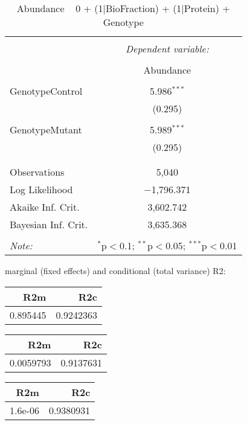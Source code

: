\documentclass[11pt]{report}
\begin{document}
\begin{table}[!htbp] \centering 
  \caption{Abundance ~ 0 + (1|BioFraction) + (1|Protein) + Genotype} 
  \label{} 
\begin{tabular}{@{\extracolsep{5pt}}lc} 
\\[-1.8ex]\hline 
\hline \\[-1.8ex] 
 & \multicolumn{1}{c}{\textit{Dependent variable:}} \\ 
\cline{2-2} 
\\[-1.8ex] & Abundance \\ 
\hline \\[-1.8ex] 
 GenotypeControl & 5.986$^{***}$ \\ 
  & (0.295) \\ 
  & \\ 
 GenotypeMutant & 5.989$^{***}$ \\ 
  & (0.295) \\ 
  & \\ 
\hline \\[-1.8ex] 
Observations & 5,040 \\ 
Log Likelihood & $-$1,796.371 \\ 
Akaike Inf. Crit. & 3,602.742 \\ 
Bayesian Inf. Crit. & 3,635.368 \\ 
\hline 
\hline \\[-1.8ex] 
\textit{Note:}  & \multicolumn{1}{r}{$^{*}$p$<$0.1; $^{**}$p$<$0.05; $^{***}$p$<$0.01} \\ 
\end{tabular} 
\end{table} 
marginal (fixed effects) and conditional (total variance) R2:

\begin{tabular}{r|r}
\hline
R2m & R2c\\
\hline
0.895445 & 0.9242363\\
\hline
\end{tabular}

\begin{tabular}{r|r}
\hline
R2m & R2c\\
\hline
0.0059793 & 0.9137631\\
\hline
\end{tabular}

\begin{tabular}{r|r}
\hline
R2m & R2c\\
\hline
1.6e-06 & 0.9380931\\
\hline
\end{tabular}
\end{document}
